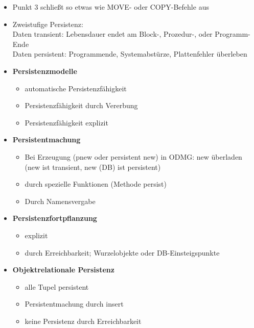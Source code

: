 \begin{itemize}
	\item Punkt 3 schließt so etwas wie MOVE- oder COPY-Befehle aus
	\item Zweistufige Persistenz:\\
	Daten transient: Lebensdauer endet am Block-, Prozedur-, oder Programm-Ende\\
	Daten persistent: Programmende, Systemabstürze, Plattenfehler überleben
	
	\item \textbf{Persistenzmodelle}
	\begin{itemize}
		\item automatische Persistenzfähigkeit 
		\item Persistenzfähigkeit durch Vererbung
		\item Persistenzfähigkeit explizit
	\end{itemize}
	
	\item \textbf{Persistentmachung}
	\begin{itemize}
		\item Bei Erzeugung (pnew oder persistent new) in ODMG: new überladen (new ist transient, new (DB) ist persistent)
		\item durch spezielle Funktionen (Methode persist)
		\item Durch Namensvergabe
	\end{itemize}
	\item \textbf{Persistenzfortpflanzung}
	\begin{itemize}
		\item explizit
		\item durch Erreichbarkeit; Wurzelobjekte oder DB-Einsteigspunkte
	\end{itemize}
	
	\item \textbf{Objektrelationale Persistenz}
	\begin{itemize}
		\item alle Tupel persistent
		\item Persistentmachung durch insert
		\item keine Persistenz durch Erreichbarkeit
	\end{itemize}
\end{itemize}


